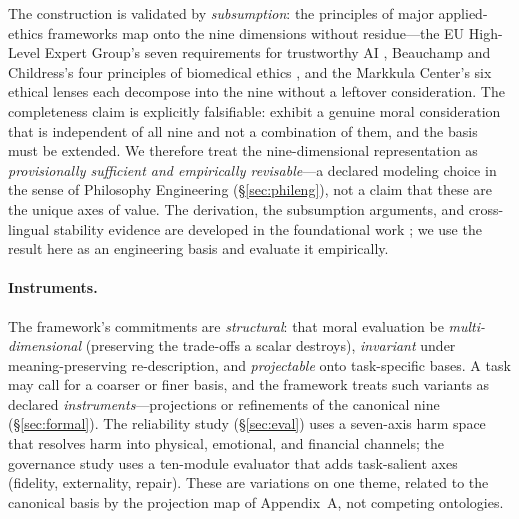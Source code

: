 The construction is validated by
\emph{subsumption}: the principles of major applied-ethics frameworks map onto the nine
dimensions without residue---the EU High-Level Expert Group's seven requirements for
trustworthy AI \citep{euhleg2019}, Beauchamp and Childress's four principles of biomedical
ethics \citep{beauchamp2019}, and the Markkula Center's six ethical lenses \citep{markkula}
each decompose into the nine without a leftover consideration.
 The completeness claim is explicitly falsifiable: exhibit a genuine moral
consideration that is independent of all nine and not a combination of them, and the basis
must be extended.  We therefore
treat the nine-dimensional representation as
\emph{provisionally sufficient and empirically revisable}---a declared modeling choice in the
sense of Philosophy Engineering (\S\ref{sec:phileng}), not a claim that these are the unique
axes of value. The derivation, the subsumption arguments, and cross-lingual stability
evidence are developed in the foundational work \citep{bond_geometric_ethics}; we use the
result here as an engineering basis and evaluate it empirically.

\paragraph{Instruments.}
The framework's commitments are \emph{structural}: that moral evaluation be
\emph{multi-dimensional} (preserving the trade-offs a scalar destroys), \emph{invariant}
under meaning-preserving re-description, and \emph{projectable} onto task-specific bases. A
task may call for a coarser or finer basis, and the framework treats such variants as
declared \emph{instruments}---projections or refinements of the canonical nine
(\S\ref{sec:formal}). The reliability study (\S\ref{sec:eval}) uses a seven-axis harm space
that resolves harm into physical, emotional, and financial channels; the governance study
uses a ten-module evaluator that adds task-salient axes (fidelity, externality, repair).
These are variations on one theme, related to the canonical basis by the projection map of
Appendix~A, not competing ontologies.

